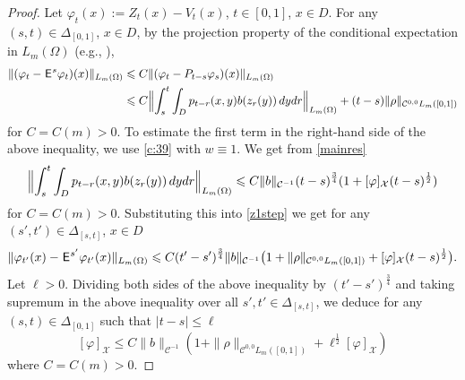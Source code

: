 \documentclass[12pt]{article}
\theoremstyle{definition}
\DeclareMathOperator{\1}{\mathbbm{1}}%
\def\E{\hskip.15ex\mathsf{E}\hskip.10ex}
\def\phi{\varphi}
\renewcommand{\le}{\leqslant}
\newcommand{\nn}{\nonumber}
\newcommand{\C}{\mathcal{C}}
\newcommand{\X}{\mathcal{X}}
\begin{document}
\begin{proof}
Let $\phi_t(x):=Z_t(x)-V_t(x)$, $t\in[0,1]$, $x\in D$. 
For any $(s,t)\in\Delta_{[0,1]}$, ${x\in D}$, by  the projection property of the conditional expectation in $L_m(\Omega)$ (e.g., \cite[Lemma~4.2(i)]{BDGLevy}),
\begin{align}\label{z1step} 	
\|(\phi_t-\E^s \phi_t)(x)\|_{L_m(\Omega)}&\le C \|(\phi_t-P_{t-s}\phi_s)(x)\|_{L_m(\Omega)}\\
&\le  
C\Bigl\|\int_s^t\int_D p_{t-r}(x,y) b(z_r(y))\,dydr\Bigr\|_{L_m(\Omega)}+(t-s) \|\rho\|_{ \C^{0,0}L_m([0,1])}\nn 
\end{align}
for $C=C(m)>0$. 
To estimate the first term in the right-hand side of the above inequality, we use \cref{c:39} with $w\equiv1$. 
We get from \eqref{mainres} 
$$
\Bigl\|\int_s^t\int_D p_{t-r}(x,y) b(z_r(y))\,dydr\Bigr\|_{L_m(\Omega)}\le C \|b\|_{\C^{-1}} (t-s)^{\frac34}(1+[\phi]_{\X}(t-s)^{\frac12})
$$
for $C=C(m)>0$. 	
Substituting this into \eqref{z1step} we get for any $(s',t')\in\Delta_{[s,t]}$, $x\in D$
$$
\|\phi_{t'}(x)-\E^{s'}\phi_{t'}(x)\|_{L_m(\Omega)} \le  C(t'-s')^{\frac34}\|b\|_{\C^{-1}}\bigl(1+\|\rho\|_{\C^{0,0} L_m([0,1])}+[\phi]_{\X}(t-s)^{\frac12}\bigr).
$$ 
Let $\ell>0$. Dividing both sides of the above inequality by $(t'-s')^{\frac34}$ and taking supremum in the above inequality over all $s',t'\in \Delta_{[s,t]}$, we deduce for any $(s,t)\in\Delta_{[0,1]}$ such that $|t-s|\le \ell$
\begin{equation}\label{xminyhn}
[\phi]_{\X}\le  C \|b\|_{\C^{-1}} (1+\|\rho\|_{\C^{0,0} L_m([0,1])}+ \ell^{\frac12}	[\phi]_{\X}) 
\end{equation}	
where $C=C(m)>0$.


\end{proof}
\end{document}
